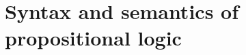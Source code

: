 

\setcounter{section}{1}
\setcounter{subsection}{1}
\setcounter{dfn}{0}

\section{Syntax and semantics of propositional logic}

